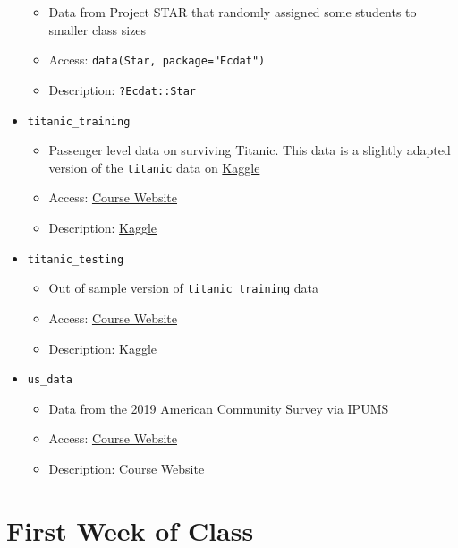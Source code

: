 \documentclass[
  letterpaper,
  DIV=11,
  numbers=noendperiod]{scrreprt}
\begin{document}
\begin{itemize}
  \begin{itemize}
  \item
    Data from Project STAR that randomly assigned some students to
    smaller class sizes
  \item
    Access: \texttt{data(Star,\ package="Ecdat")}
  \item
    Description: \texttt{?Ecdat::Star}
  \end{itemize}
\item
  \texttt{titanic\_training}

  \begin{itemize}
  \item
    Passenger level data on surviving Titanic. This data is a slightly
    adapted version of the \texttt{titanic} data on
    \href{https://www.kaggle.com/c/titanic}{Kaggle}
  \item
    Access:
    \href{http://bcallaway11.github.io/Courses/ECON_4750_Fall_2023/}{Course
    Website}
  \item
    Description: \href{https://www.kaggle.com/c/titanic/data}{Kaggle}
  \end{itemize}
\item
  \texttt{titanic\_testing}

  \begin{itemize}
  \item
    Out of sample version of \texttt{titanic\_training} data
  \item
    Access:
    \href{http://bcallaway11.github.io/Courses/ECON_4750_Fall_2023/}{Course
    Website}
  \item
    Description: \href{https://www.kaggle.com/c/titanic/data}{Kaggle}
  \end{itemize}
\item
  \texttt{us\_data}

  \begin{itemize}
  \item
    Data from the 2019 American Community Survey via IPUMS
  \item
    Access:
    \href{http://bcallaway11.github.io/Courses/ECON_4750_Fall_2023/}{Course
    Website}
  \item
    Description:
    \href{http://bcallaway11.github.io/Courses/ECON_4750_Fall_2023/}{Course
    Website}
  \end{itemize}
\end{itemize}

\section{First Week of Class}\label{first-week-of-class}
\end{document}
